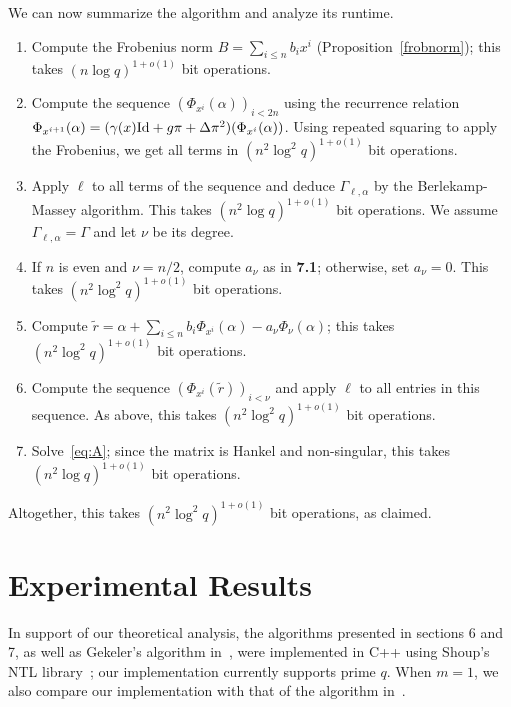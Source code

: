 \documentclass[sigconf]{acmart}
\begin{document}
\smallskip{} We can now summarize the algorithm and
analyze its runtime.
\begin{enumerate}
\item Compute the Frobenius norm $B=\sum_{i \le n} b_i x^i$ (Proposition~\ref{frobnorm});
this takes $(n \log q)^{1+o(1)}$ bit operations.
\item Compute the sequence $(\Phi_{x^{i}}(\alpha))_{i < 2n}$ using the
  recurrence relation $\Phi_{x^{i+1}}(\alpha) = (\gamma(x) {\rm Id} +
  g\pi + \Delta \pi^2)(\Phi_{x^i}(\alpha))$. Using repeated squaring to
  apply the Frobenius, we get all terms in $(n^2 \log^2 q)^{1+o(1)}$ bit
  operations.
\item Apply $\ell$ to all terms of the sequence and deduce
  $\Gamma_{\ell,\alpha}$ by the Berlekamp-Massey algorithm. This takes
  $(n^2 \log q)^{1+o(1)}$ bit operations. We assume
  $\Gamma_{\ell,\alpha}=\Gamma$ and let $\nu$ be its degree.
\item If $n$ is even and $\nu=n/2$, compute $a_\nu$ as in {\bf 7.1};
  otherwise, set $a_\nu=0$. This takes $(n^2 \log^2 q)^{1+o(1)}$ bit
  operations.
\item Compute $\tilde r = \alpha + \sum_{i \le n} b_i
  \Phi_{x^{i}}(\alpha) - a_\nu \Phi_\nu(\alpha)$; this takes $(n^2
  \log^2 q)^{1+o(1)}$ bit operations.
\item Compute the sequence $(\Phi_{x^{i}}(\tilde r))_{i < \nu}$
  and apply $\ell$ to all entries in this sequence. As above, this takes
 $(n^2 \log^2 q)^{1+o(1)}$ bit
  operations.
\item Solve~\eqref{eq:A}; since the matrix is Hankel and non-singular,
  this takes $(n^2 \log q)^{1+o(1)}$ bit operations.
\end{enumerate}
Altogether, this takes  $(n^2 \log^2 q)^{1+o(1)}$ bit operations,
as claimed.


\section{Experimental Results}\label{sec:experiments}

In support of our theoretical analysis, the algorithms presented in
sections 6 and 7, as well as Gekeler's algorithm
in~\cite[Section~3]{frobdist}, were implemented in C++ using Shoup's
NTL library~\cite{shoup2001ntl}; our implementation currently supports
 prime $q$.  When $m=1$, we also compare our implementation
with that of the algorithm in~\cite{eschost2017arXiv171200669D}.
\end{document}
